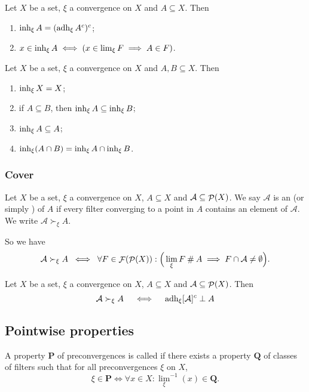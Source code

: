 \begin{lemma}
Let $X$ be a set, $\xi$ a convergence on $X$ and $A \subseteq X$. Then
\begin{enumerate}
\item $\operatorname{inh}_\xi A = (\operatorname{adh}_\xi A^c)^c$;
\item $x\in \operatorname{inh}_\xi A \iff (x\in \lim_\xi F \implies A\in F)$.
\end{enumerate}
\end{lemma}

\begin{proposition}
Let $X$ be a set, $\xi$ a convergence on $X$ and $A,B \subseteq X$. Then
\begin{enumerate}
\item $\operatorname{inh}_\xi X = X$;
\item if $A \subseteq B$, then $\operatorname{inh}_\xi A \subseteq \operatorname{inh}_\xi B$;
\item $\operatorname{inh}_\xi A\subseteq A$;
\item $\operatorname{inh}_\xi(A\cap B) = \operatorname{inh}_\xi A \cap \operatorname{inh}_\xi B$.
\end{enumerate}
\end{proposition}

\subsubsection{Cover}
\begin{definition}
Let $X$ be a set, $\xi$ a convergence on $X$, $A\subseteq X$ and $\mathcal{A}\subseteq \mathop{\mathcal{P}}(X)$.
We say $\mathcal{A}$ is an  (or simply ) of $A$ if every filter converging to a point in $A$ contains an element of $\mathcal{A}$. We write $\mathcal{A} \succ_\xi A$.
\end{definition}
So we have
\[ \mathcal{A} \succ_\xi A \;\iff\; \forall F\in \mathop{\mathcal{F}}(\mathop{\mathcal{P}}(X)): \Big( \lim_\xi F \mathbin{\#} A \implies F \cap \mathcal{A} \neq \emptyset \Big). \]

\begin{proposition}
Let $X$ be a set, $\xi$ a convergence on $X$, $A\subseteq X$ and $\mathcal{A}\subseteq \mathop{\mathcal{P}}(X)$. Then
\[ \mathcal{A} \succ_\xi A \quad\iff\quad \operatorname{adh}_\xi [\mathcal{A}]^c \perp A \]
\end{proposition}


\subsection{Pointwise properties}
\begin{definition}
A property $\mathbf{P}$ of preconvergences is called  if there exists a property $\mathbf{Q}$ of classes of filters such that for all preconvergences $\xi$ on $X$,
\[ \xi \in \mathbf{P} \iff \forall x\in X: {\lim_\xi}^{-1}(x) \in \mathbf{Q}. \]
\end{definition}

